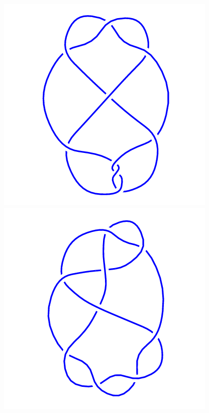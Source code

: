 \begin{figure}[H]
\begin{minipage}[b]{.18\linewidth}
	\end{minipage}
	\begin{minipage}[b]{.18\linewidth}
		\centering
		\includegraphics[width=\linewidth]{../data/9_13.png}
	\end{minipage}
	\begin{minipage}[b]{.18\linewidth}
		\centering
		\includegraphics[width=\linewidth]{../data/9_14.png}

\end{minipage}
\end{figure}
